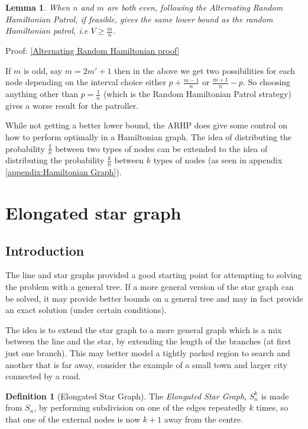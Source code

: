 \documentclass[a4paper,10pt]{article}
\newtheorem{lemma}[theorem]{Lemma}
\theoremstyle{definition}
\newtheorem{definition}[theorem]{Definition}
\theoremstyle{definition}
\theoremstyle{remark}
\theoremstyle{definition}
\begin{document}
\begin{lemma}
When $n$ and $m$ are both even, following the Alternating Random Hamiltonian Patrol, if feasible, gives the same lower bound as the random Hamiltonian patrol, i.e $V \geq \frac{m}{n}$.
\end{lemma}

Proof: \ref{Alternating Random Hamiltonian proof}

If $m$ is odd, say $m=2m'+1$ then in the above we get two possibilities for each node depending on the interval choice either $p+\frac{m-1}{n}$ or $\frac{m+1}{n}-p$. So choosing anything other than $p=\frac{1}{n}$ (which is the Random Hamiltonian Patrol strategy) gives a worse result for the patroller.

While not getting a better lower bound, the ARHP does give some control on how to perform optimally in a Hamiltonian graph. The idea of distributing the probability $\frac{2}{n}$ between two types of nodes can be extended to the idea of distributing the probability $\frac{k}{n}$ between $k$ types of nodes (as seen in appendix \ref{appendix:Hamiltonian Graph}).

\section{Elongated star graph}
\subsection{Introduction}

The line and star graphs provided a good starting point for attempting to solving the problem with a general tree. If a more general version of the star graph can be solved, it may provide better bounds on a general tree and may in fact provide an exact solution (under certain conditions). 

The idea is to extend the star graph to a more general graph which is a mix between the line and the star, by extending the length of the branches (at first just one branch). This may better model a tightly packed region to search and another that is far away, consider the example of a small town and larger city connected by a road. 

\begin{definition}[Elongated Star Graph]
The \textit{Elongated Star Graph}, $S_{n}^k$ is made from $S_{n}$, by performing subdivision on one of the edges repeatedly $k$ times, so that one of the external nodes is now $k+1$ away from the centre.
\end{definition}
\end{document}
